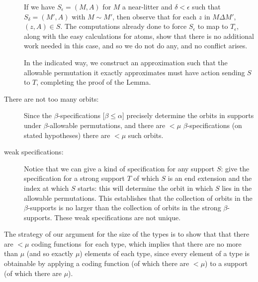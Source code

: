 \documentclass[112pt]{article}
\begin{document}
\begin{description}
If we have $S_\epsilon=(M,A)$ for $M$ a near-litter and $\delta<\epsilon$ such that
$S_\delta = (M',A)$ with $M \sim M'$, then observe that for each $z$ in $M \Delta M'$,
$(z,A) \in S$.  The computations already done to force $S_\epsilon$ to map to $T_\epsilon$, along with the easy calculations for atoms, show that there is no additional work needed in this case, and so we do not do any, and no conflict arises.

In the indicated way, we construct an approximation such that the allowable permutation it exactly approximates must have action sending $S$ to $T$, completing the proof of the Lemma.

\item[There are not too many orbits:]  Since the $\beta$-specifications [$\beta \leq \alpha$] precisely determine the orbits in supports under $\beta$-allowable permutations, and there are $<\mu$ $\beta$-specifications
(on stated hypotheses) there are $<\mu$ such orbits.

\item[weak specifications:]  Notice that we can give a kind of specification for any support $S$:  give the specification for a strong support $T$ of which $S$ is an end extension and the index at which $S$ starts:  this will determine the orbit in which $S$ lies in the allowable permutations.
This establishes that the collection of orbits in the $\beta$-supports is no larger than the collection of orbits in the strong $\beta$-supports.  These weak specifications are not unique.

\end{description}





The strategy of our argument for the size of the types is to show that that there are $<\mu$ coding functions\ for each type, which implies that there are no more than $\mu$ (and so exactly $\mu$) elements of each type, since every element of a type is obtainable by applying a coding function (of which there are $<\mu$) to a support (of which there are $\mu$).
\end{document}
